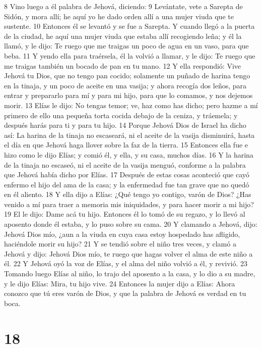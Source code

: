 8 Vino luego a él palabra de Jehová, diciendo:
9 Levántate, vete a Sarepta de Sidón, y mora allí; he aquí yo he dado orden allí a una mujer viuda que te sustente.
10 Entonces él se levantó y se fue a Sarepta. Y cuando llegó a la puerta de la ciudad, he aquí una mujer viuda que estaba allí recogiendo leña; y él la llamó, y le dijo: Te ruego que me traigas un poco de agua en un vaso, para que beba.
11 Y yendo ella para traérsela, él la volvió a llamar, y le dijo: Te ruego que me traigas también un bocado de pan en tu mano.
12 Y ella respondió: Vive Jehová tu Dios, que no tengo pan cocido; solamente un puñado de harina tengo en la tinaja, y un poco de aceite en una vasija; y ahora recogía dos leños, para entrar y prepararlo para mí y para mi hijo, para que lo comamos, y nos dejemos morir. 
13 Elías le dijo: No tengas temor; ve, haz como has dicho; pero hazme a mí primero de ello una pequeña torta cocida debajo de la ceniza, y tráemela; y después harás para ti y para tu hijo.
14 Porque Jehová Dios de Israel ha dicho así: La harina de la tinaja no escaseará, ni el aceite de la vasija disminuirá, hasta el día en que Jehová haga llover sobre la faz de la tierra.
15 Entonces ella fue e hizo como le dijo Elías; y comió él, y ella, y su casa, muchos días.
16 Y la harina de la tinaja no escaseó, ni el aceite de la vasija menguó, conforme a la palabra que Jehová había dicho por Elías.
17 Después de estas cosas aconteció que cayó enfermo el hijo del ama de la casa; y la enfermedad fue tan grave que no quedó en él aliento.
18 Y ella dijo a Elías: ¿Qué tengo yo contigo, varón de Dios? ¿Has venido a mí para traer a memoria mis iniquidades, y para hacer morir a mi hijo?
19 El le dijo: Dame acá tu hijo. Entonces él lo tomó de su regazo, y lo llevó al aposento donde él estaba, y lo puso sobre su cama.
20 Y clamando a Jehová, dijo: Jehová Dios mío, ¿aun a la viuda en cuya casa estoy hospedado has afligido, haciéndole morir su hijo?
21 Y se tendió sobre el niño tres veces, y clamó a Jehová y dijo: Jehová Dios mío, te ruego que hagas volver el alma de este niño a él.
22 Y Jehová oyó la voz de Elías, y el alma del niño volvió a él, y revivió.
23 Tomando luego Elías al niño, lo trajo del aposento a la casa, y lo dio a su madre, y le dijo Elías: Mira, tu hijo vive.
24 Entonces la mujer dijo a Elías: Ahora conozco que tú eres varón de Dios, y que la palabra de Jehová es verdad en tu boca.

\chapter{18}

